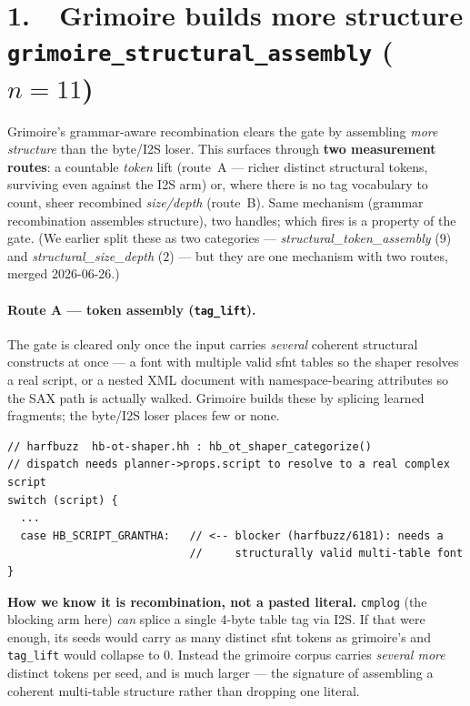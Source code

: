 \documentclass[11pt]{article}
\begin{document}
\section*{1.\ \ Grimoire builds more structure \hfill {\normalsize\texttt{grimoire\_structural\_assembly} ($n=11$)}}
Grimoire's grammar-aware recombination clears the gate by assembling \emph{more
structure} than the byte/I2S loser. This surfaces through \textbf{two measurement
routes}: a countable \emph{token} lift (route~A --- richer distinct structural
tokens, surviving even against the I2S arm) or, where there is no tag vocabulary
to count, sheer recombined \emph{size/depth} (route~B). Same mechanism (grammar
recombination assembles structure), two handles; which fires is a property of the
gate. (We earlier split these as two categories --- \emph{structural\_token\_assembly}
($9$) and \emph{structural\_size\_depth} ($2$) --- but they are one mechanism with
two routes, merged 2026-06-26.)

\paragraph{Route A --- token assembly (\texttt{tag\_lift}).} The gate is cleared
only once the input carries \emph{several} coherent
structural constructs at once --- a font with multiple valid sfnt tables so the
shaper resolves a real script, or a nested XML document with namespace-bearing
attributes so the SAX path is actually walked. Grimoire builds these by splicing
learned fragments; the byte/I2S loser places few or none.

\begin{lstlisting}[style=c]
// harfbuzz  hb-ot-shaper.hh : hb_ot_shaper_categorize()
// dispatch needs planner->props.script to resolve to a real complex script
switch (script) {
  ...
  case HB_SCRIPT_GRANTHA:   // <-- blocker (harfbuzz/6181): needs a
                            //     structurally valid multi-table font
}
\end{lstlisting}

\noindent\textbf{How we know it is recombination, not a pasted literal.}
\texttt{cmplog} (the blocking arm here) \emph{can} splice a single 4-byte table
tag via I2S. If that were enough, its seeds would carry as many distinct sfnt
tokens as grimoire's and \texttt{tag\_lift} would collapse to $0$. Instead the
grimoire corpus carries \emph{several more} distinct tokens per seed, and is much
larger --- the signature of assembling a coherent multi-table structure rather
than dropping one literal.
\end{document}

